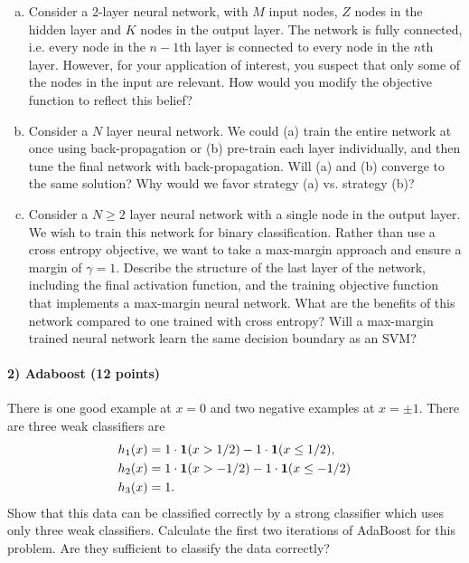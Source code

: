 \documentclass[11pt]{article}
\begin{document}
	\begin{enumerate}[(a)]
		\item Consider a 2-layer neural network, with $M$ input nodes, $Z$ nodes in the hidden layer and $K$ nodes in the output layer. The network is fully connected, i.e. every node in the $n-1$th layer is connected to every node in the $n$th layer. However, for your application of interest, you suspect that only some of the nodes in the input are relevant. How would you modify the objective function to reflect this belief?
		
		\item Consider a $N$ layer neural network. We could (a) train the entire network at once using back-propagation or (b) pre-train each layer individually, and then tune the final network with back-propagation. Will (a) and (b) converge to the same solution? Why would we favor strategy (a) vs. strategy (b)?
		
		\item Consider a $N\ge2$ layer neural network with a single node in the output layer. We wish to train this network for binary classification. Rather than use a cross entropy objective, we want to take a max-margin approach and ensure a margin of $\gamma=1$. Describe the structure of the last layer of the network, including the final activation function, and the training objective function that implements a max-margin neural network. What are the benefits of this network compared to one trained with cross entropy? Will a max-margin trained neural network learn the same decision boundary as an SVM?
		
		
	\end{enumerate}
		
	
	\paragraph{2) Adaboost (12 points)} There is one good example at $x=0$ and two negative examples at $x = \pm 1$. There are three weak classifiers are
	\begin{align*}
	h_1(x) & = 1\cdot{\bf1}(x > 1/2) -1\cdot{\bf1}(x \leq 1/2),\\
	h_2(x) & = 1\cdot{\bf1}(x > -1/2) -1\cdot{\bf1}(x \leq -1/2)\\
	h_3(x) & =1.
	\end{align*}
	Show that this data can be classified correctly by a strong classifier which uses only three weak classifiers. Calculate the first two iterations of AdaBoost for this problem. Are they sufficient to classify the data correctly?
	
\end{document}
